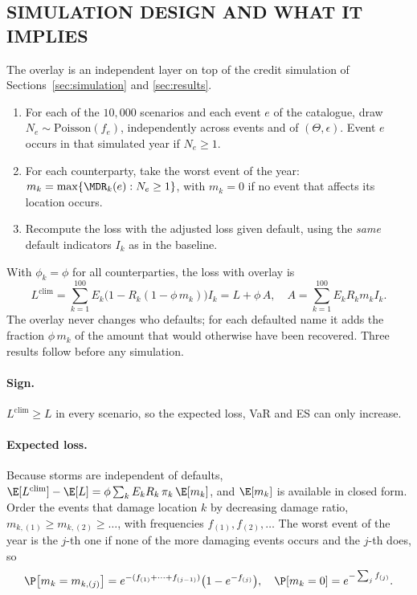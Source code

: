 \subsection{SIMULATION DESIGN AND WHAT IT IMPLIES}
\label{subsec:climdesign}
The overlay is an independent layer on top of the credit simulation of Sections~\ref{sec:simulation} and \ref{sec:results}.
\begin{enumerate}
\item For each of the $10{,}000$ scenarios and each event $e$ of the catalogue, draw $N_e\sim\mathrm{Poisson}(f_e)$, independently across events and of $(\Theta,\epsilon)$. Event $e$ occurs in that simulated year if $N_e\ge1$.
\item For each counterparty, take the worst event of the year: $m_k=\max\{\MDR_k(e):N_e\ge1\}$, with $m_k=0$ if no event that affects its location occurs.
\item Recompute the loss with the adjusted loss given default, using the \emph{same} default indicators $I_k$ as in the baseline.
\end{enumerate}
With $\phi_k=\phi$ for all counterparties, the loss with overlay is
\begin{equation}
\label{eq:lclim}
L^{\mathrm{clim}}=\sum_{k=1}^{100}E_k\big(1-R_k(1-\phi\, m_k)\big)I_k=L+\phi\,A,\quad A=\sum_{k=1}^{100}E_kR_km_kI_k .
\end{equation}
The overlay never changes who defaults; for each defaulted name it adds the fraction $\phi\,m_k$ of the amount that would otherwise have been recovered. Three results follow before any simulation.

\paragraph{Sign.}
$L^{\mathrm{clim}}\ge L$ in every scenario, so the expected loss, VaR and ES can only increase.

\paragraph{Expected loss.}
Because storms are independent of defaults, $\E[L^{\mathrm{clim}}]-\E[L]=\phi\sum_kE_kR_k\,\pi_k\,\E[m_k]$, and $\E[m_k]$ is available in closed form. Order the events that damage location $k$ by decreasing damage ratio, $m_{k,(1)}\ge m_{k,(2)}\ge\dots$, with frequencies $f_{(1)},f_{(2)},\dots$ The worst event of the year is the $j$-th one if none of the more damaging events occurs and the $j$-th does, so
\begin{equation}
\label{eq:worstlaw}
\P\big[m_k=m_{k,(j)}\big]=e^{-(f_{(1)}+\dots+f_{(j-1)})}\big(1-e^{-f_{(j)}}\big),\quad \P[m_k=0]=e^{-\sum_jf_{(j)}} .
\end{equation}

